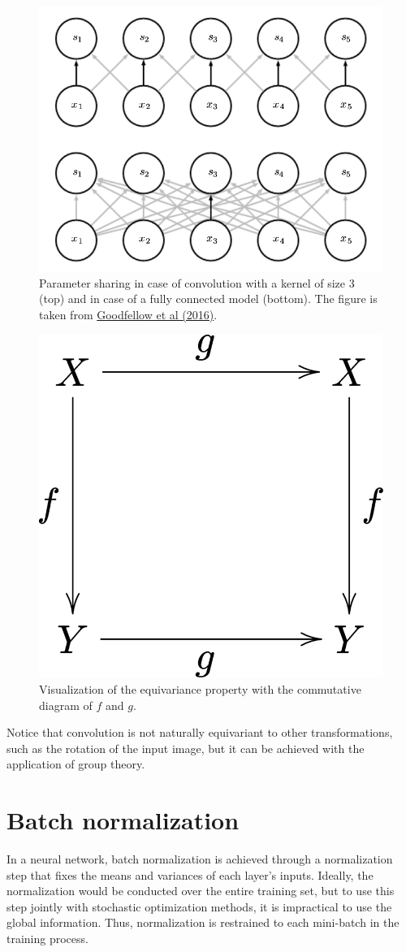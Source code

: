 \documentclass[12pt]{article}
\theoremstyle{plain}
\begin{document}
\begin{itemize}
\begin{figure}[h]
	\begin{center}
	\includegraphics[width=0.5\linewidth]{media/parameter_sharing_conv.png}
	\caption{Parameter sharing in case of convolution with a kernel of size $3$ (top) and in case of a fully connected model (bottom). The figure is taken from \protect\hyperlink{Deeplea_Goodfellow}{Goodfellow et al (2016)}. }
	\label{parameter_sharing_conv}
	\end{center}
\end{figure}

\begin{figure}[h!]
	\begin{center}
	\includegraphics[width=0.3\linewidth]{media/Equivariant_commutative_diagram.png}
	\caption{Visualization of the equivariance property with the commutative diagram of $f$ and $g$. }
	\label{commutative_diag_1}
	\end{center}
\end{figure}
\end{itemize}

Notice that convolution is not naturally equivariant to other transformations, such as the rotation of the input image, but it can be achieved with the application of group theory.

\pagebreak
\section{Batch normalization}

In a neural network, batch normalization is achieved through a normalization step that fixes the means and variances of each layer's inputs. Ideally, the normalization would be conducted over the entire training set, but to use this step jointly with stochastic optimization methods, it is impractical to use the global information. Thus, normalization is restrained to each mini-batch in the training process.
\end{document}
